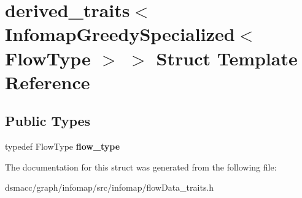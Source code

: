 \hypertarget{structderived__traits_3_01InfomapGreedySpecialized_3_01FlowType_01_4_01_4}{}\section{derived\+\_\+traits$<$ Infomap\+Greedy\+Specialized$<$ Flow\+Type $>$ $>$ Struct Template Reference}
\label{structderived__traits_3_01InfomapGreedySpecialized_3_01FlowType_01_4_01_4}
\subsection*{Public Types}
\begin{DoxyCompactItemize}
\item 
\mbox{\label{structderived__traits_3_01InfomapGreedySpecialized_3_01FlowType_01_4_01_4_a80317eaaa5accbcd2772470e37969c64}} 
typedef Flow\+Type {\bfseries flow\+\_\+type}
\end{DoxyCompactItemize}


The documentation for this struct was generated from the following file\+:\begin{DoxyCompactItemize}
\item 
dsmacc/graph/infomap/src/infomap/flow\+Data\+\_\+traits.\+h\end{DoxyCompactItemize}
